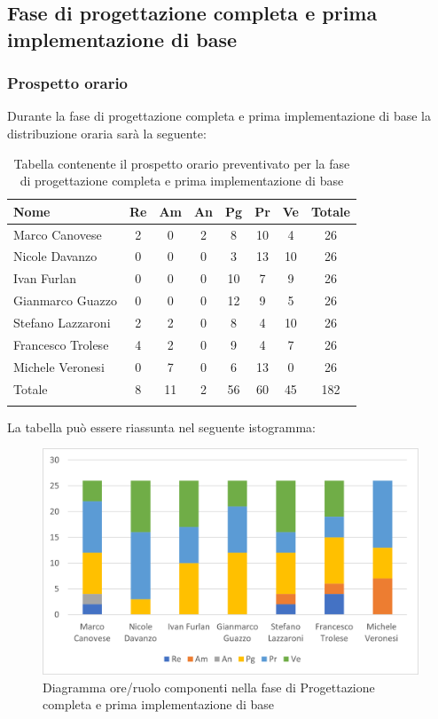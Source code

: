 			\subsection{Fase di progettazione completa e prima implementazione di base}
            \subsubsection{Prospetto orario}
			Durante la fase di progettazione completa e prima implementazione di base la distribuzione oraria sarà la seguente:
			
			\begin{longtable}{|l|c|c|c|c|c|c|c|}
				\hline
				\rowcolor{lighter-grayer}
				\textbf{Nome} & \textbf{Re} & \textbf{Am} & \textbf{An} & \textbf{Pg}  & \textbf{Pr}   & \textbf{Ve} & \textbf{Totale} \\
				\hline
				\endfirsthead
				
				\hline
				Marco Canovese & 2 & 0 & 2 & 8 & 10 & 4 & 26\\
				\hline
				\hline
				Nicole Davanzo & 0 & 0 & 0 & 3 & 13 & 10 & 26\\
				\hline
				\hline
				Ivan Furlan & 0 & 0 & 0 & 10 & 7 & 9 & 26\\
				\hline
				\hline
				Gianmarco Guazzo & 0 & 0 & 0 & 12 & 9 & 5 & 26\\
				\hline
				\hline
				Stefano Lazzaroni & 2 & 2 & 0 & 8 & 4 & 10 & 26\\
				\hline
				\hline
				Francesco Trolese & 4 & 2 & 0 & 9 & 4 & 7 & 26\\
				\hline
				\hline
				Michele Veronesi & 0 & 7 & 0 & 6 & 13 & 0 & 26\\
				\hline 
				\hline
				Totale & 8 & 11 & 2 & 56 & 60 & 45 & 182\\
				\hline 
				\rowcolor{white}
				\caption{Tabella contenente il prospetto orario preventivato per la fase di progettazione completa e prima implementazione di base}
			\end{longtable}

		
			La tabella può essere riassunta nel seguente istogramma:
		
			\begin{figure}[H]
				\centering
				\includegraphics[width=0.8\linewidth]{res/images/preventivo/5-1.png}
				\caption{Diagramma ore/ruolo componenti nella fase di Progettazione completa e prima implementazione di base}
				\label{fig:diagramma suddivisione ruoli fase progettazione completa e prima implementazione di base}
			\end{figure}
		
